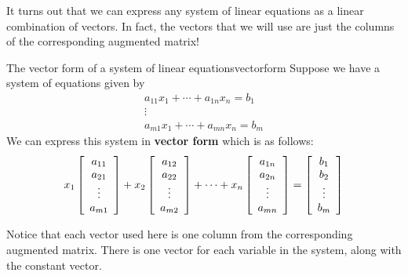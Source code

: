 It turns out that we can express any system of linear equations as a linear combination of vectors. In fact,
the vectors that we will use are just the columns of the corresponding augmented matrix! 

\begin{definition}{The vector form of a system of linear equations}{vectorform}
Suppose we have a system of equations given by
\begin{equation*}
\begin{array}{c}
a_{11}x_{1}+\cdots +a_{1n}x_{n}=b_{1} \\
\vdots \\
a_{m1}x_{1}+\cdots +a_{mn}x_{n}=b_{m}
\end{array}
\end{equation*}
We can express this system in \textbf{vector form} which is as follows:
\begin{equation*}
x_1
\left[
\begin{array}{c}
a_{11}\\
a_{21}\\
\vdots \\
a_{m1}
\end{array}
\right]
+
x_2
\left[
\begin{array}{c}
a_{12}\\
a_{22}\\
\vdots \\
a_{m2}
\end{array}
\right]
+
\cdots
+
x_n
\left[
\begin{array}{c}
a_{1n}\\
a_{2n}\\
\vdots \\
a_{mn}
\end{array}
\right]
=
\left[
\begin{array}{c}
b_1\\
b_2\\
\vdots \\
b_m
\end{array}
\right]
\end{equation*}
\end{definition}

Notice that each vector used here is one column from the corresponding augmented  matrix. There is one vector for each variable in the system,
along with the constant vector. 


